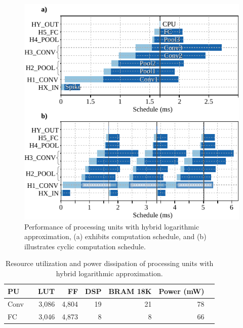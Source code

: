 \begin{figure}[b!]
	\centering
	\includegraphics[width=0.5\columnwidth]{./chapters/sbs_accelerator/figures/latency_log_cycle.pdf}
	\caption{Performance of processing units with hybrid logarithmic approximation, (a) exhibits computation schedule, and (b) illustrates cyclic computation schedule.}
	\label{fig:latency_pu_log_cycle}
\end{figure}

\begin{table}[!h]\centering
	\caption{Resource utilization and power dissipation of processing units with hybrid logarithmic approximation.}\label{tab:resource_log}
	\scriptsize
\begin{tabular}{lrrrrrrr}\toprule
	\textbf{PU} & &\textbf{LUT} &\textbf{FF} &\textbf{DSP} &\textbf{BRAM 18K} &\textbf{Power (mW)} \\\midrule
	Conv & &3,086 &4,804 &19 &21 &78 \\
	FC & &3,046 &4,873 &8 &8 &66 \\
	\bottomrule
\end{tabular}
\end{table}




